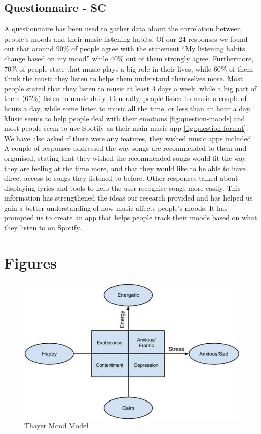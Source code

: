 \documentclass[10pt, notitlepage]{report}
\begin{document}
\subsection{Questionnaire - SC}
\label{res:quest}
A questionnaire has been used to gather data about the correlation between people’s moods and their music listening habits. Of our 24 responses we found out that around 90\% of people agree with the statement “My listening habits change based on my mood” while 40\% out of them strongly agree. Furthermore, 70\% of people state that music plays a big role in their lives, while 60\% of them think the music they listen to helps them understand themselves more. Most people stated that they listen to music at least 4 days a week, while a big part of them (65\%) listen to music daily. Generally, people listen to music a couple of hours a day, while some listen to music all the time, or less than an hour a day. Music seems to help people deal with their emotions \ref{fig:question-moods} and most people seem to use Spotify as their main music app \ref{fig:question-format}. We have also asked if there were any features, they wished music apps included. A couple of responses addressed the way songs are recommended to them and organised, stating that they wished the recommended songs would fit the way they are feeling at the time more, and that they would like to be able to have direct access to songs they listened to before. Other responses talked about displaying lyrics and tools to help the user recognise songs more easily. This information has strengthened the ideas our research provided and has helped us gain a better understanding of how music affects people’s moods. It has prompted us to create an app that helps people track their moods based on what they listen to on Spotify.

\newpage

\section{Figures}

\begin{figure}[h]
	\includegraphics[width=\linewidth]{thayer-mood-model.png}
	\caption{Thayer Mood Model}
	\label{fig:thayermoodmodel}
\end{figure}
\end{document}
